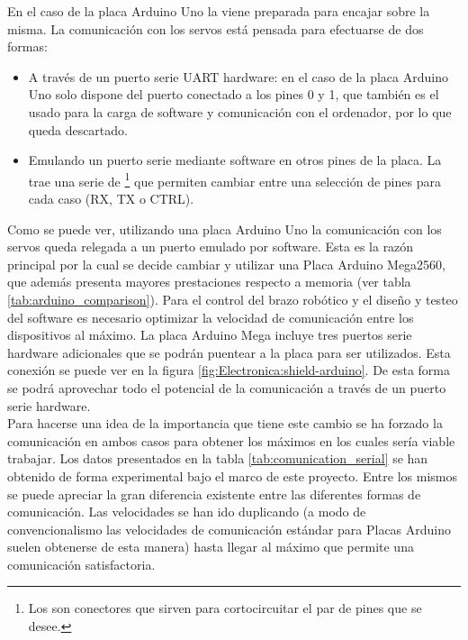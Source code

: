 	En el caso de la placa Arduino Uno la  viene preparada para encajar sobre la misma. La comunicación con los servos está pensada para efectuarse de dos formas:
	\begin{itemize}
		\item A través de un puerto serie UART hardware: en el caso de la placa Arduino Uno solo dispone del puerto conectado a los pines 0 y 1, que también es el usado para la carga de software y comunicación con el ordenador, por lo que queda descartado.
		\item Emulando un puerto serie mediante software en otros pines de la placa. La  trae una serie de  \footnote{Los  son conectores que sirven para cortocircuitar el par de pines que se desee.} que permiten cambiar entre una selección de pines para cada caso (RX, TX o CTRL).
	\end{itemize}

	Como se puede ver, utilizando una placa Arduino Uno la comunicación con los servos queda relegada a un puerto emulado por software. Esta es la razón principal por la cual se decide cambiar y utilizar una Placa Arduino Mega2560, que además presenta mayores prestaciones respecto a memoria (ver tabla \ref{tab:arduino_comparison}). Para el control del brazo robótico y el diseño y testeo del software es necesario optimizar la velocidad de comunicación entre los dispositivos al máximo. La placa Arduino Mega incluye tres puertos serie hardware adicionales que se podrán puentear a la placa  para ser utilizados. Esta conexión se puede ver en la figura \ref{fig:Electronica:shield-arduino}. De esta forma se podrá aprovechar todo el potencial de la comunicación a través de un puerto serie hardware.
	\\

	Para hacerse una idea de la importancia que tiene este cambio se ha forzado la comunicación en ambos casos para obtener los máximos en los cuales sería viable trabajar. Los datos presentados en la tabla \ref{tab:comunication_serial} se han obtenido de forma experimental bajo el marco de este proyecto. Entre los mismos se puede apreciar la gran diferencia existente entre las diferentes formas de comunicación. Las velocidades se han ido duplicando (a modo de convencionalismo las velocidades de comunicación estándar para Placas Arduino suelen obtenerse de esta manera) hasta llegar al máximo que permite una comunicación satisfactoria.

